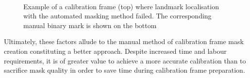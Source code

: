 \begin{figure}[htbp]
    \centering
    \\[1mm]
    \caption{Example of a calibration frame (top) where landmark localisation with the automated
    masking method failed. The corresponding manual binary mark is shown on the bottom}
    \label{fig:15m_frame}
\end{figure}

Ultimately, these factors allude to the manual method of calibration frame mask creation
constituting a better approach.
Despite increased time and labour requirements, it is of greater value to achieve a
more accurate calibration than to sacrifice mask quality in order to save time during
calibration frame preparation.
